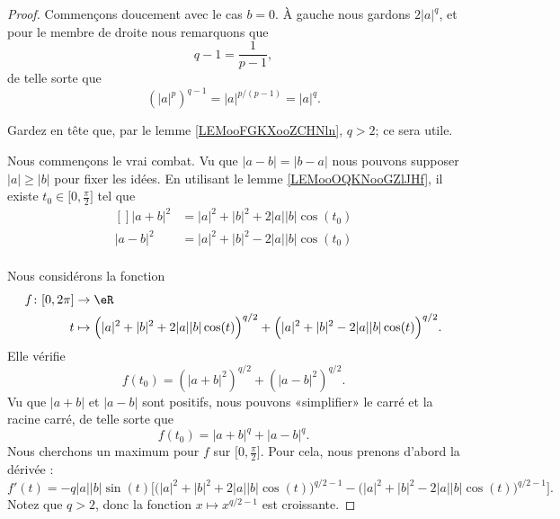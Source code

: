 	\begin{proof}
		Commençons doucement avec le cas \( b=0\). À gauche nous gardons \( 2| a |^q\), et pour le membre de droite nous remarquons que
		\begin{equation}
			q-1=\frac{ 1 }{ p-1 },
		\end{equation}
		de telle sorte que
		\begin{equation}
			(| a |^p)^{q-1}=| a |^{p/(p-1)}=|a|^q.
		\end{equation}

		Gardez en tête que, par le lemme \ref{LEMooFGKXooZCHNln}, \( q>2\); ce sera utile.

		Nous commençons le vrai combat. Vu que \( | a-b |=| b-a |\) nous pouvons supposer \( | a |\geq | b |\) pour fixer les idées. En utilisant le lemme \ref{LEMooOQKNooGZlJHf}, il existe \( t_0\in\mathopen[ 0 , \frac{ \pi }{2} \mathclose]\) tel que
		\begin{equation}
			\begin{aligned}[]
				| a+b |^2 & =| a |^2+| b |^2+2| a | |b |\cos(t_0) \\
				| a-b |^2 & =| a |^2+| b |^2-2| a | |b |\cos(t_0) \\
			\end{aligned}
		\end{equation}

		Nous considérons la fonction
		\begin{equation}
			\begin{aligned}
				f\colon \mathopen[ 0 , 2\pi \mathclose] & \to \eR                                                                                                              \\
				t                                       & \mapsto \Big( | a |^2+| b |^2+2| a | |b |\cos(t) \Big)^{q/2}+  \Big( | a |^2+| b |^2-2| a | |b |\cos(t) \Big)^{q/2}.
			\end{aligned}
		\end{equation}
		Elle vérifie
		\begin{equation}
			f(t_0)=(| a+b |^2)^{q/2}+(| a-b |^2)^{q/2}.
		\end{equation}
		Vu que \( | a+b |\) et \( | a-b |\) sont positifs, nous pouvons «simplifier» le carré et la racine carré, de telle sorte que
		\begin{equation}
			f(t_0)=| a+b |^q+| a-b |^q.
		\end{equation}
		Nous cherchons un maximum pour \( f\) sur \( \mathopen[ 0 , \frac{ \pi }{2} \mathclose]\). Pour cela, nous prenons d'abord la dérivée :
		\begin{equation}
			f'(t)=-q| a | |b |\sin(t)\Big[   \big( | a |^2+| b |^2+2| a | |b |\cos(t) \big)^{q/2-1}-\big( | a |^2+| b |^2-2| a | |b |\cos(t) \big)^{q/2-1}    \Big].
		\end{equation}
		Notez que \( q>2\), donc la fonction \( x\mapsto x^{q/2-1}\) est croissante.


\end{proof}
